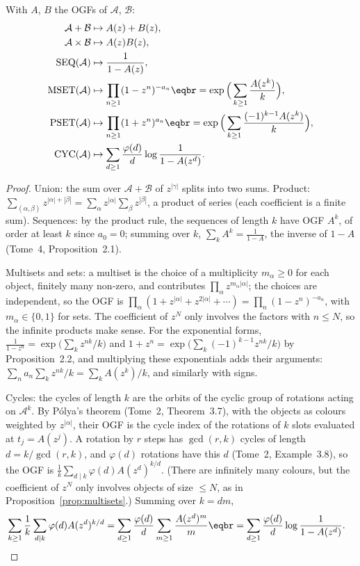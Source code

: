 \begin{theorem}\label{thm:dictionary}
With $A$, $B$ the OGFs of $\mathcal A$, $\mathcal B$:
\[
\begin{aligned}
\mathcal A+\mathcal B&\mapsto A(z)+B(z),\\
\mathcal A\times\mathcal B&\mapsto A(z)B(z),\\
\operatorname{SEQ}(\mathcal A)&\mapsto\frac1{1-A(z)},\\
\operatorname{MSET}(\mathcal A)&\mapsto\prod_{n\ge1}(1-z^n)^{-a_n}\eqbr=\exp\Big(\sum_{k\ge1}\frac{A(z^k)}k\Big),\\
\operatorname{PSET}(\mathcal A)&\mapsto\prod_{n\ge1}(1+z^n)^{a_n}\eqbr=\exp\Big(\sum_{k\ge1}\frac{(-1)^{k-1}A(z^k)}k\Big),\\
\operatorname{CYC}(\mathcal A)&\mapsto\sum_{d\ge1}\frac{\varphi(d)}d\log\frac1{1-A(z^d)} .
\end{aligned}
\]
\end{theorem}
\begin{proof}
Union: the sum over $\mathcal A+\mathcal B$ of $z^{|\gamma|}$ splits into two sums. Product: $\sum_{(\alpha,\beta)}z^{|\alpha|+|\beta|}=\sum_\alpha z^{|\alpha|}\sum_\beta z^{|\beta|}$, a product of series
(each coefficient is a finite sum). Sequences: by the product rule, the sequences of length $k$ have OGF $A^k$, of order at least $k$
since $a_0=0$; summing over $k$, $\sum_kA^k=\frac1{1-A}$, the inverse of $1-A$ (Tome~4, Proposition~2.1).

Multisets and sets: a multiset is the choice of a multiplicity $m_\alpha\ge0$ for each object, finitely many non-zero, and contributes
$\prod_\alpha z^{m_\alpha|\alpha|}$; the choices are independent, so the OGF is $\prod_\alpha(1+z^{|\alpha|}+z^{2|\alpha|}+\cdots)=\prod_n(1-z^n)^{-a_n}$, with $m_\alpha\in\{0,1\}$
for sets. The coefficient of $z^N$ only involves the factors with $n\le N$, so the infinite products make sense. For the exponential
forms, $\frac1{1-z^n}=\exp\big(\sum_kz^{nk}/k\big)$ and $1+z^n=\exp\big(\sum_k(-1)^{k-1}z^{nk}/k\big)$ by Proposition~2.2, and multiplying these exponentials
adds their arguments: $\sum_na_n\sum_kz^{nk}/k=\sum_kA(z^k)/k$, and similarly with signs.

Cycles: the cycles of length $k$ are the orbits of the cyclic group of rotations acting on $\mathcal A^k$. By P\'olya's theorem
(Tome~2, Theorem~3.7), with the objects as colours weighted by $z^{|\alpha|}$, their OGF is the cycle index of the rotations of $k$
slots evaluated at $t_j=A(z^j)$. A rotation by $r$ steps has $\gcd(r,k)$ cycles of length $d=k/\gcd(r,k)$, and $\varphi(d)$ rotations have this
$d$ (Tome~2, Example~3.8), so the OGF is $\frac1k\sum_{d\mid k}\varphi(d)A(z^d)^{k/d}$. (There are infinitely many colours, but the coefficient of $z^N$
only involves objects of size $\le N$, as in Proposition~\ref{prop:multisets}.) Summing over $k=dm$,
\[
\begin{aligned}{}&\sum_{k\ge1}\frac1k\sum_{d\mid k}\varphi(d)A(z^d)^{k/d}=\sum_{d\ge1}\frac{\varphi(d)}d\sum_{m\ge1}\frac{A(z^d)^m}m\eqbr=\sum_{d\ge1}\frac{\varphi(d)}d\log\frac1{1-A(z^d)}.\end{aligned}
\]
\end{proof}

